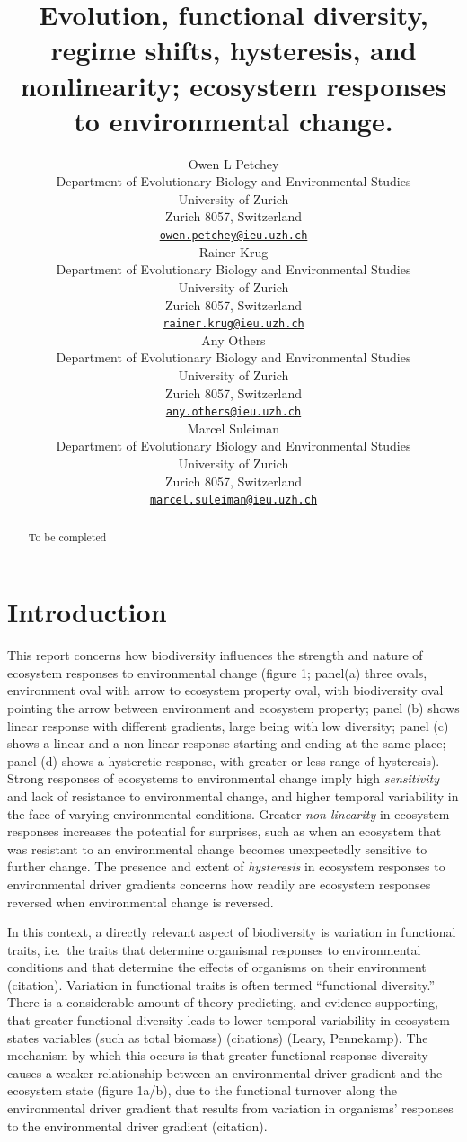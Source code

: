 \documentclass{article}
\title{Evolution, functional diversity, regime shifts, hysteresis, and
nonlinearity; ecosystem responses to environmental change.}
\author{
    Owen L Petchey
   \\
    Department of Evolutionary Biology and Environmental Studies \\
    University of Zurich \\
  Zurich 8057, Switzerland \\
  \texttt{\href{mailto:owen.petchey@ieu.uzh.ch}{\nolinkurl{owen.petchey@ieu.uzh.ch}}} \\
   \And
    Rainer Krug
   \\
    Department of Evolutionary Biology and Environmental Studies \\
    University of Zurich \\
  Zurich 8057, Switzerland \\
  \texttt{\href{mailto:rainer.krug@ieu.uzh.ch}{\nolinkurl{rainer.krug@ieu.uzh.ch}}} \\
   \And
    Any Others
   \\
    Department of Evolutionary Biology and Environmental Studies \\
    University of Zurich \\
  Zurich 8057, Switzerland \\
  \texttt{\href{mailto:any.others@ieu.uzh.ch}{\nolinkurl{any.others@ieu.uzh.ch}}} \\
   \And
    Marcel Suleiman
   \\
    Department of Evolutionary Biology and Environmental Studies \\
    University of Zurich \\
  Zurich 8057, Switzerland \\
  \texttt{\href{mailto:marcel.suleiman@ieu.uzh.ch}{\nolinkurl{marcel.suleiman@ieu.uzh.ch}}} \\
  }
\begin{document}
\maketitle

\def\tightlist{}


\begin{abstract}
To be completed
\end{abstract}


\hypertarget{introduction}{%
\section{Introduction}\label{introduction}}

This report concerns how biodiversity influences the strength and nature
of ecosystem responses to environmental change (figure 1; panel(a) three
ovals, environment oval with arrow to ecosystem property oval, with
biodiversity oval pointing the arrow between environment and ecosystem
property; panel (b) shows linear response with different gradients,
large being with low diversity; panel (c) shows a linear and a
non-linear response starting and ending at the same place; panel (d)
shows a hysteretic response, with greater or less range of hysteresis).
Strong responses of ecosystems to environmental change imply high
\emph{sensitivity} and lack of resistance to environmental change, and
higher temporal variability in the face of varying environmental
conditions. Greater \emph{non-linearity} in ecosystem responses
increases the potential for surprises, such as when an ecosystem that
was resistant to an environmental change becomes unexpectedly sensitive
to further change. The presence and extent of \emph{hysteresis} in
ecosystem responses to environmental driver gradients concerns how
readily are ecosystem responses reversed when environmental change is
reversed.

In this context, a directly relevant aspect of biodiversity is variation
in functional traits, i.e.~the traits that determine organismal
responses to environmental conditions and that determine the effects of
organisms on their environment (citation). Variation in functional
traits is often termed ``functional diversity.'' There is a considerable
amount of theory predicting, and evidence supporting, that greater
functional diversity leads to lower temporal variability in ecosystem
states variables (such as total biomass) (citations) (Leary, Pennekamp).
The mechanism by which this occurs is that greater functional response
diversity causes a weaker relationship between an environmental driver
gradient and the ecosystem state (figure 1a/b), due to the functional
turnover along the environmental driver gradient that results from
variation in organisms' responses to the environmental driver gradient
(citation).
\end{document}
